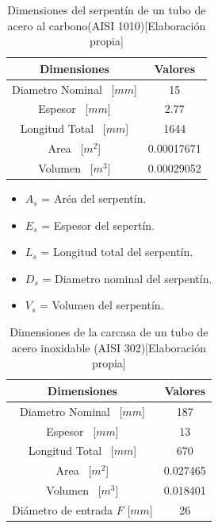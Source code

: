 \documentclass[12pt,letterpaper]{article}     %
\begin{document}
\begin{table} [!ht]
\caption{Dimensiones del serpentín de un tubo de acero al carbono(AISI 1010)[Elaboración propia]}

\label{Tab:dimencionesserpentin}
\begin{center}
\begin{tabular}{| c | c | }
\hline

\cline{1-2}
\textbf{Dimensiones}& \textbf{Valores} \\
\hline 

Diametro Nominal \ [$mm$] & 15  \\
\hline
Espesor \ [$mm$] & 2.77   \\
\hline
Longitud Total \ [$mm$] & 1644 \\
\hline
Area \ [$m^2$]  & 0.00017671   \\
\hline
Volumen \ [$m^3$] & 0.00029052   \\
\hline
\end{tabular}
\end{center}
\end{table}


\begin{itemize}
    \item $A_{s}$ = Aréa del serpentín. 
    \item $E_{s}$ = Espesor del sepertín.
    \item $L_{s}$ = Longitud total del serpentín.
    \item $D_{s}$ = Diametro nominal del serpentín.
    \item $V_{s}$ = Volumen del serpentín.
\end{itemize}



\begin{table} [!ht]
\caption{Dimensiones de la carcasa de un tubo de acero inoxidable (AISI 302)[Elaboración propia]}

\label{Tab:dimencioncarcas}
\begin{center}
\begin{tabular}{| c | c | }
\hline

\cline{1-2}
\textbf{Dimensiones}& \textbf{Valores} \\
\hline 

Diametro Nominal \ [$mm$] & 187  \\
\hline
Espesor \ [$mm$] & 13   \\
\hline
Longitud Total \ [$mm$] & 670 \\
\hline
Area \ [$m^2$]  & 0.027465   \\
\hline
Volumen \ [$m^3$] & 0.018401   \\
\hline
Diámetro de entrada $F$ [$mm$] & 26 \\
\hline
\end{tabular}
\end{center}
\end{table}
\end{document}
